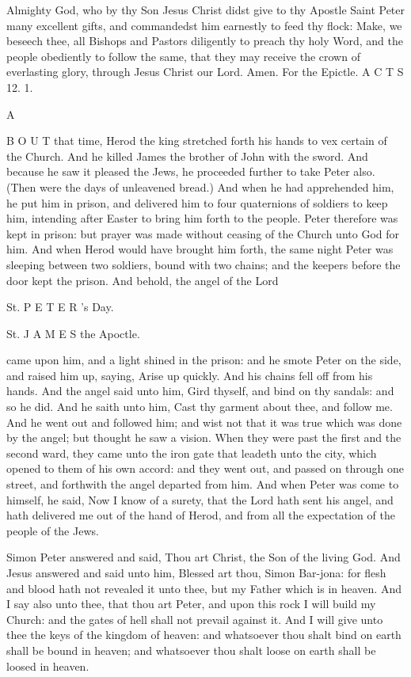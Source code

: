 Almighty God, who by thy Son Jesus Christ didst give to thy Apostle Saint Peter many excellent gifts, and commandedst him earnestly to feed thy flock: Make, we beseech thee, all Bishops and Pastors diligently to preach thy holy Word, and the people obediently to follow the same, that they may receive the crown of everlasting glory, through Jesus Christ our Lord. Amen. For the Epictle. A C T S 12. 1.

A

B O U T that time, Herod the king stretched forth his hands to vex certain of the Church. And he killed James the brother of John with the sword. And because he saw it pleased the Jews, he proceeded further to take Peter also. (Then were the days of unleavened bread.) And when he had apprehended him, he put him in prison, and delivered him to four quaternions of soldiers to keep him, intending after Easter to bring him forth to the people. Peter therefore was kept in prison: but prayer was made without ceasing of the Church unto God for him. And when Herod would have brought him forth, the same night Peter was sleeping between two soldiers, bound with two chains; and the keepers before the door kept the prison. And behold, the angel of the Lord

St. P E T E R ’s Day.

St. J A M E S the Apoctle.

came upon him, and a light shined in the prison: and he smote Peter on the side, and raised him up, saying, Arise up quickly. And his chains fell off from his hands. And the angel said unto him, Gird thyself, and bind on thy sandals: and so he did. And he saith unto him, Cast thy garment about thee, and follow me. And he went out and followed him; and wist not that it was true which was done by the angel; but thought he saw a vision. When they were past the first and the second ward, they came unto the iron gate that leadeth unto the city, which opened to them of his own accord: and they went out, and passed on through one street, and forthwith the angel departed from him. And when Peter was come to himself, he said, Now I know of a surety, that the Lord hath sent his angel, and hath delivered me out of the hand of Herod, and from all the expectation of the people of the Jews.

Simon Peter answered and said, Thou art Christ, the Son of the living God. And Jesus answered and said unto him, Blessed art thou, Simon Bar-jona: for flesh and blood hath not revealed it unto thee, but my Father which is in heaven. And I say also unto thee, that thou art Peter, and upon this rock I will build my Church: and the gates of hell shall not prevail against it. And I will give unto thee the keys of the kingdom of heaven: and whatsoever thou shalt bind on earth shall be bound in heaven; and whatsoever thou shalt loose on earth shall be loosed in heaven.

